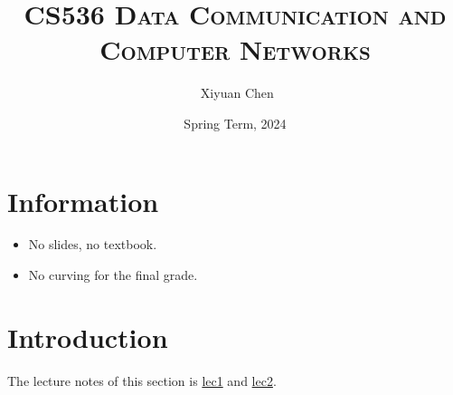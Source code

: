 \documentclass{../../ainote}
\author{\ccLogo \,\,Xiyuan Chen}
\title{\textsc{CS536 Data Communication and Computer Networks}}
\date{Spring Term, 2024}
\begin{document}
\maketitle
\doclicenseThis
\section*{Information}
\begin{itemize}
	\item No slides, no textbook.
	\item No curving for the final grade.
\end{itemize}
\tableofcontents
\newpage

\section{Introduction} 
The lecture notes of this section is 
\href{https://www.cs.purdue.edu/homes/park/cs536/intro-536-24s-a.pdf}{lec1} and 
\href{https://www.cs.purdue.edu/homes/park/cs536/intro-536-24s-b.pdf}{lec2}.
\end{document}
